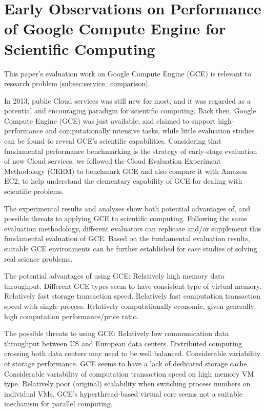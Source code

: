 \section{Early Observations on Performance of Google Compute Engine for Scientific Computing}

This paper’s evaluation work on Google Compute Engine (GCE) is relevant to research problem \ref{subsec:service_comparison}.

In 2013, public Cloud services was still new for most, and it was regarded as a potential and encouraging paradigm for scientific computing. Back then, Google Compute Engine (GCE) was just available, and claimed to support high-performance and computationally intensive tasks, while little evaluation studies can be found to reveal GCE’s scientific capabilities. Considering that fundamental performance benchmarking is the strategy of early-stage evaluation of new Cloud services, we followed the Cloud Evaluation Experiment Methodology (CEEM) to benchmark GCE and also compare it with Amazon EC2, to help understand the elementary capability of GCE for dealing with scientific problems. 

The experimental results and analyses show both potential advantages of, and possible threats to applying GCE to scientific computing. Following the same evaluation methodology, different evaluators can replicate and/or supplement this fundamental evaluation of GCE. Based on the fundamental evaluation results, suitable GCE environments can be further established for case studies of solving real science problems.

The potential advantages of using GCE: Relatively high memory data throughput. Different GCE types seem to have consistent type of virtual memory. Relatively fast storage transaction speed.
Relatively fast computation transaction speed with single process. Relatively computationally economic, given generally high computation performance/price ratio.

The possible threats to using GCE: Relatively low communication data throughput between
US and European data centers. Distributed computing crossing both data centers may need to be well balanced. Considerable variability of storage performance. GCE seems to have a lack of dedicated storage cache. Considerable variability of computation transaction
speed on high memory VM type. Relatively poor (original) scalability when switching
process numbers on individual VMs. GCE’s hyperthread-based virtual core seems not a suitable mechanism for parallel computing.

